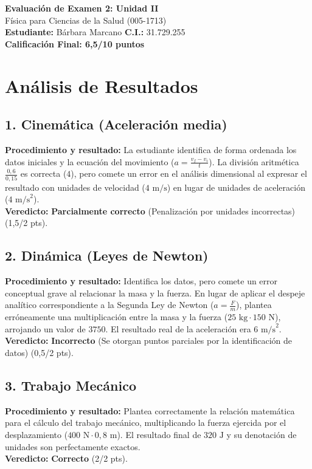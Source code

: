 \documentclass[12pt,letterpaper]{article}
\begin{document}
\begin{center}
    \Large \textbf{Evaluación de Examen 2: Unidad II} \\
    \large Física para Ciencias de la Salud (005-1713) \\
    \vspace{0.5cm}
    \textbf{Estudiante:} Bárbara Marcano \quad \textbf{C.I.:} 31.729.255
    \vspace{0.3cm} \\
    \large \textbf{Calificación Final: 6,5/10 puntos}
\end{center}

\vspace{0.5cm}

\section*{Análisis de Resultados}

\subsection*{1. Cinemática (Aceleración media)}
\textbf{Procedimiento y resultado:} La estudiante identifica de forma ordenada los datos iniciales y la ecuación del movimiento ($a = \frac{v_f - v_i}{t}$). La división aritmética $\frac{0,6}{0,15}$ es correcta ($4$), pero comete un error en el análisis dimensional al expresar el resultado con unidades de velocidad ($4 \text{ m/s}$) en lugar de unidades de aceleración ($4 \text{ m/s}^2$). \\
\textbf{Veredicto:} \textbf{Parcialmente correcto} (Penalización por unidades incorrectas) (1,5/2 pts).

\subsection*{2. Dinámica (Leyes de Newton)}
\textbf{Procedimiento y resultado:} Identifica los datos, pero comete un error conceptual grave al relacionar la masa y la fuerza. En lugar de aplicar el despeje analítico correspondiente a la Segunda Ley de Newton ($a = \frac{F}{m}$), plantea erróneamente una multiplicación entre la masa y la fuerza ($25 \text{ kg} \cdot 150 \text{ N}$), arrojando un valor de $3750$. El resultado real de la aceleración era $6 \text{ m/s}^2$. \\
\textbf{Veredicto:} \textbf{Incorrecto} (Se otorgan puntos parciales por la identificación de datos) (0,5/2 pts).

\subsection*{3. Trabajo Mecánico}
\textbf{Procedimiento y resultado:} Plantea correctamente la relación matemática para el cálculo del trabajo mecánico, multiplicando la fuerza ejercida por el desplazamiento ($400 \text{ N} \cdot 0,8 \text{ m}$). El resultado final de $320 \text{ J}$ y su denotación de unidades son perfectamente exactos. \\
\textbf{Veredicto:} \textbf{Correcto} (2/2 pts).
\end{document}
